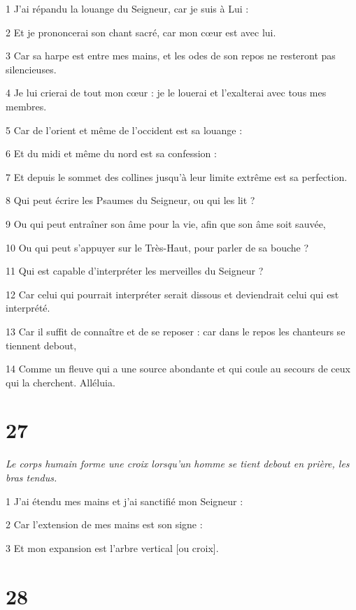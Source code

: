 \par 1 J'ai répandu la louange du Seigneur, car je suis à Lui :
\par 2 Et je prononcerai son chant sacré, car mon cœur est avec lui.
\par 3 Car sa harpe est entre mes mains, et les odes de son repos ne resteront pas silencieuses.
\par 4 Je lui crierai de tout mon cœur : je le louerai et l'exalterai avec tous mes membres.
\par 5 Car de l'orient et même de l'occident est sa louange :
\par 6 Et du midi et même du nord est sa confession :
\par 7 Et depuis le sommet des collines jusqu'à leur limite extrême est sa perfection.
\par 8 Qui peut écrire les Psaumes du Seigneur, ou qui les lit ?
\par 9 Ou qui peut entraîner son âme pour la vie, afin que son âme soit sauvée,
\par 10 Ou qui peut s'appuyer sur le Très-Haut, pour parler de sa bouche ?
\par 11 Qui est capable d'interpréter les merveilles du Seigneur ?
\par 12 Car celui qui pourrait interpréter serait dissous et deviendrait celui qui est interprété.
\par 13 Car il suffit de connaître et de se reposer : car dans le repos les chanteurs se tiennent debout,
\par 14 Comme un fleuve qui a une source abondante et qui coule au secours de ceux qui la cherchent. Alléluia.

\chapter{27}

\par \textit{Le corps humain forme une croix lorsqu'un homme se tient debout en prière, les bras tendus.}

\par 1 J'ai étendu mes mains et j'ai sanctifié mon Seigneur :
\par 2 Car l'extension de mes mains est son signe :
\par 3 Et mon expansion est l'arbre vertical [ou croix].



\chapter{28}

